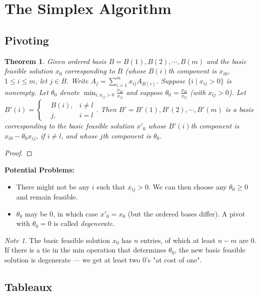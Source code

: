 \documentclass[11pt]{article} %
\theoremstyle{plain}%
\newtheorem{thm}{Theorem}[section]
\theoremstyle{definition}
\theoremstyle{remark}
\newtheorem*{note}{Note}
\begin{document}
\section{The Simplex Algorithm}

\subsection{Pivoting}

\begin{thm}
Given ordered basis $B = B(1) , B(2), \cdots, B(m)$ and the basic feasible solution $x_0$
corresponding to $B$ (whose $B(i)$th component is $x_{i0}$, $1 \leq i \leq m$, let $j \in B$. 
Write $A_j = \sum_{i=1}^m x_{ij} A_{B(i)}$. Suppose $\{ i \mid x_{ij} > 0 \}$ is nonempty. 
Let $\theta_0$ denote $\min_{i:x_{ij} > 0} \frac{x_{i0}}{x_{ij}}$ and suppose 
$\theta_0 = \frac{x_{l0}}{x_{lj}}$ (with $x_{lj} > 0$). Let $ B'(i) = \left\{ 
\begin{aligned}
&B(i), &i \neq l\\
&j, &i = l
\end{aligned}
\right. $. Then $B' = B'(1), B'(2), \cdots, B'(m)$ is a basis corresponding to the basic feasible 
solution $x'_0$ whose $B'(i)$th component is $x_{i0} - \theta_0 x_{ij}$, if $i \neq l$, and whose 
$j$th component is $\theta_0$. 
\end{thm}

\begin{proof}

\end{proof}

\textbf{Potential Problems:}
\begin{itemize}
\item There might not be any $i$ such that  $x_{ij} > 0$. We can then choose any 
$\theta_0 \geq 0$ and remain feasible. 
\item $\theta_0$ may be $0$, in which case $x'_0 = x_0$ (but the ordered bases differ).
A pivot with $\theta_0 = 0$ is called \emph{degenerate}. 
\end{itemize}

\begin{note}
	The basic feasible solution $x_0$ has $n$ entries, of which at least $n-m$ are $0$. 
	If there is a tie in the min operation that determines $\theta_0$, the new basic 
	feasible solution is degenerate --- we get at least two $0$'s "at cost of one". 
\end{note}

\subsection{Tableaux}
\end{document}
